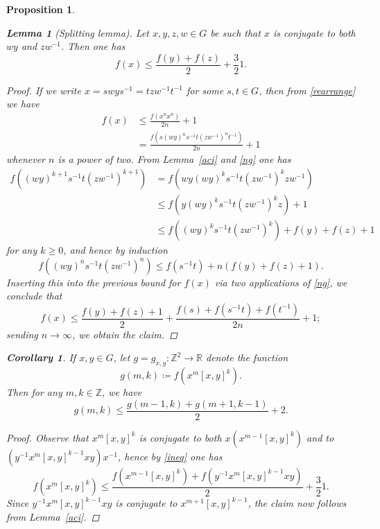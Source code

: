 \documentclass{article}
\numberwithin{equation}{section}
\theoremstyle{plain}
\newtheorem{proposition}[equation]{Proposition}
\newtheorem{lemma}[equation]{Lemma}
\newtheorem{corollary}[equation]{Corollary}
\theoremstyle{definition}
\newcommand\R{\mathbb{R}}
\newcommand\Z{\mathbb{Z}}
\begin{document}
\begin{proposition}
\begin{lemma}[Splitting lemma]\label{split}
	Let $x,y,z,w \in G$ be such that $x$ is conjugate to both $wy$ and
	$zw^{-1}$.  Then one has
	\begin{equation}\label{ineq}
		f(x) \leq \frac{f(y) + f( z ) }{2}  + \frac{3}{2}
		{ 1}.
	\end{equation}
\end{lemma}

\begin{proof}
	If we write $x = swys^{-1} = t zw^{-1} t^{-1}$ for some $s,t \in G$, then
	from \eqref{rearrange} we have
	\begin{align*}
		f(x) & \leq \frac{f( x^n x^n ) }{2n} + { 1}                    \\
		         & = \frac{f( s(wy)^n s^{-1}t (zw^{-1})^n t^{-1} ) }{2n} + 
		{ 1}
	\end{align*}
	whenever $n$ is a power of two.  From Lemma~\ref{aci} and \eqref{ng} one
	has
	\begin{align*}
		f((wy)^{k+1} s^{-1}t (zw^{-1})^{k+1} ) & = f( w y (wy)^k s^{-1} t                                      
		(zw^{-1})^k z w^{-1} ) \\
		                                           & \leq f( y (wy)^k s^{-1} t (zw^{-1})^k z ) + { 1}              \\
		                                           & \leq f( (wy)^k s^{-1} t (zw^{-1})^k ) + f(y) + f(z) + 
		{ 1}
	\end{align*}
	for any $k \geq 0$, and hence by induction
	\[
		f((wy)^n s^{-1}t (zw^{-1})^n ) \leq f(s^{-1} t) + n ( f(y) +
		f(z) + { 1} ).
	\]
	Inserting this into the previous bound for $f(x)$ via two
	applications of \eqref{ng}, we conclude that
	\[
		f(x) \leq \frac{f(y) + f(z)+ { 1} }{2} +
		\frac{f(s) + f(s^{-1}t) + f(t^{-1}) }{2n} + { 1};
	\]
	sending $n \to \infty$, we obtain the claim.
\end{proof}


\begin{corollary}
	If $x,y \in G$, let $g = g_{x,y}: \Z^2 \to \R$ denote the function
	\[
		g(m,k) \coloneqq f( x^m [x,y]^k ).
	\]
	Then for any $m,k \in \Z$, we have
	\begin{equation}\label{fmk}
		g(m,k) \leq \frac{g(m-1,k) + g(m+1,k-1)}{2} + { 2}.
	\end{equation}
\end{corollary}

\begin{proof}
	Observe that $x^m [x,y]^k$ is conjugate to both $x (x^{m-1} [x,y]^k)$ and
	to $(y^{-1} x^m [x,y]^{k-1} xy) x^{-1}$, hence by \eqref{ineq} one has
	\[
		f( x^m [x,y]^k ) \leq \frac{f( x^{m-1} [x,y]^k ) + f( y^{-1}
			x^{m} [x,y]^{k-1} xy )}{2} + { \frac{3}{2} 1}.
    \]
    Since $y^{-1} x^{m} [x,y]^{k-1} xy $ is conjugate to $x^{m+1}
    [x,y]^{k-1}$, the claim now follows from Lemma~\ref{aci}.
\end{proof}
		

\end{proposition}
\end{document}

